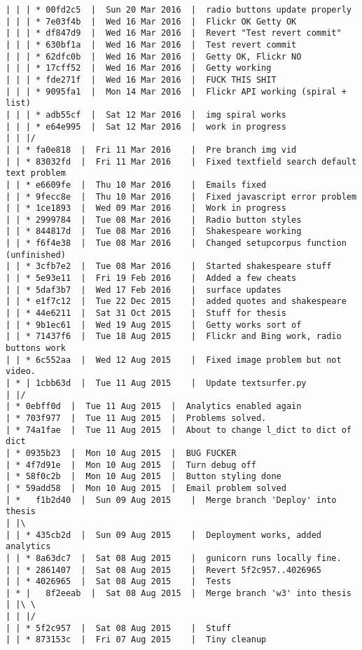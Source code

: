 \begin{verbatim}
| | | * 00fd2c5  |  Sun 20 Mar 2016	 |  radio buttons update properly
| | | * 7e03f4b  |  Wed 16 Mar 2016	 |  Flickr OK Getty OK
| | | * df847d9  |  Wed 16 Mar 2016	 |  Revert "Test revert commit"
| | | * 630bf1a  |  Wed 16 Mar 2016	 |  Test revert commit
| | | * 62dfc0b  |  Wed 16 Mar 2016	 |  Getty OK, Flickr NO
| | | * 17cff52  |  Wed 16 Mar 2016	 |  Getty working
| | | * fde271f  |  Wed 16 Mar 2016	 |  FUCK THIS SHIT
| | | * 9095fa1  |  Mon 14 Mar 2016	 |  Flickr API working (spiral + list)
| | | * adb55cf  |  Sat 12 Mar 2016	 |  img spiral works
| | | * e64e995  |  Sat 12 Mar 2016	 |  work in progress
| | |/  
| | * fa0e818  |  Fri 11 Mar 2016	 |  Pre branch img vid
| | * 83032fd  |  Fri 11 Mar 2016	 |  Fixed textfield search default text problem
| | * e6609fe  |  Thu 10 Mar 2016	 |  Emails fixed
| | * 9fecc8e  |  Thu 10 Mar 2016	 |  Fixed javascript error problem
| | * 1ce1893  |  Wed 09 Mar 2016	 |  Work in progress
| | * 2999784  |  Tue 08 Mar 2016	 |  Radio button styles
| | * 844817d  |  Tue 08 Mar 2016	 |  Shakespeare working
| | * f6f4e38  |  Tue 08 Mar 2016	 |  Changed setupcorpus function (unfinished)
| | * 3cfb7e2  |  Tue 08 Mar 2016	 |  Started shakespeare stuff
| | * 5e93e11  |  Fri 19 Feb 2016	 |  Added a few cheats
| | * 5daf3b7  |  Wed 17 Feb 2016	 |  surface updates
| | * e1f7c12  |  Tue 22 Dec 2015	 |  added quotes and shakespeare
| | * 44e6211  |  Sat 31 Oct 2015	 |  Stuff for thesis
| | * 9b1ec61  |  Wed 19 Aug 2015	 |  Getty works sort of
| | * 71437f6  |  Tue 18 Aug 2015	 |  Flickr and Bing work, radio buttons work
| | * 6c552aa  |  Wed 12 Aug 2015	 |  Fixed image problem but not video.
| * | 1cbb63d  |  Tue 11 Aug 2015	 |  Update textsurfer.py
| |/  
| * 0ebff0d  |  Tue 11 Aug 2015	 |  Analytics enabled again
| * 703f977  |  Tue 11 Aug 2015	 |  Problems solved.
| * 74a1fae  |  Tue 11 Aug 2015	 |  About to change l_dict to dict of dict
| * 0935b23  |  Mon 10 Aug 2015	 |  BUG FUCKER
| * 4f7d91e  |  Mon 10 Aug 2015	 |  Turn debug off
| * 58f0c2b  |  Mon 10 Aug 2015	 |  Button styling done
| * 59add58  |  Mon 10 Aug 2015	 |  Email problem solved
| *   f1b2d40  |  Sun 09 Aug 2015	 |  Merge branch 'Deploy' into thesis
| |\  
| | * 435cb2d  |  Sun 09 Aug 2015	 |  Deployment works, added analytics
| | * 8a63dc7  |  Sat 08 Aug 2015	 |  gunicorn runs locally fine.
| | * 2861407  |  Sat 08 Aug 2015	 |  Revert 5f2c957..4026965
| | * 4026965  |  Sat 08 Aug 2015	 |  Tests
| * |   8f2eeab  |  Sat 08 Aug 2015	 |  Merge branch 'w3' into thesis
| |\ \  
| | |/  
| | * 5f2c957  |  Sat 08 Aug 2015	 |  Stuff
| | * 873153c  |  Fri 07 Aug 2015	 |  Tiny cleanup

\end{verbatim}
